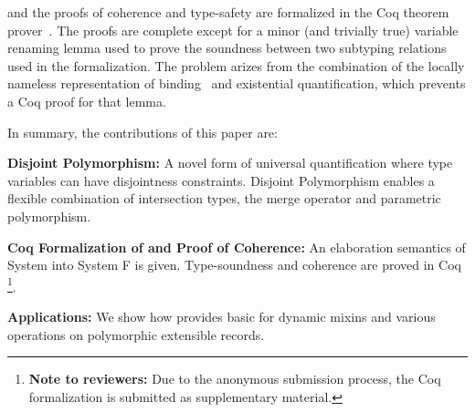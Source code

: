 \name and the proofs of coherence and type-safety are formalized in
the Coq theorem prover~\cite{}. The proofs are complete except for a minor
(and trivially true) variable renaming lemma used to prove the
soundness between two subtyping relations used in the
formalization. The problem arizes from the combination of the locally
nameless representation of binding~\cite{} and existential
quantification, which prevents a Coq proof for that lemma.

In summary, the contributions of this paper are:

\begin{itemize*}

\item {\bf Disjoint Polymorphism:} A novel form of universal
quantification where type variables can have disjointness
constraints. Disjoint Polymorphism enables a flexible combination
of intersection types, the merge operator and parametric
polymorphism. 

\item {\bf Coq Formalization of \name and Proof of Coherence:} An
  elaboration semantics of System \name into System F is
  given. Type-soundness and coherence are proved in Coq
\footnote{{\bf Note to reviewers:} Due
    to the anonymous submission process, the Coq formalization is submitted as supplementary material.}.

\item {\bf Applications:} We show how \name provides basic 
 for dynamic mixins and various operations on polymorphic extensible records.

\end{itemize*}


